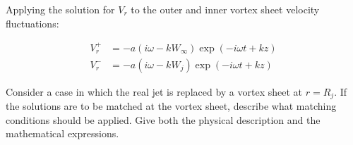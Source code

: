 \documentclass[]{aiaa-tc}%
\begin{document}
Applying the solution for $V_r$ to the outer and inner vortex sheet velocity fluctuations:

\begin{align}
V_r^+ &= -a ( i\omega - kW_{\infty} ) \exp(-i\omega t + kz)  \\
V_r^- &= -a ( i\omega - kW_j ) \exp(-i\omega t + kz)
\end{align}




Consider a case in which the real jet is replaced by a vortex sheet at $r = R_j$. If the solutions are to be matched at the vortex sheet, describe what matching conditions should be applied. Give both the physical description and the mathematical expressions.























\end{document}
